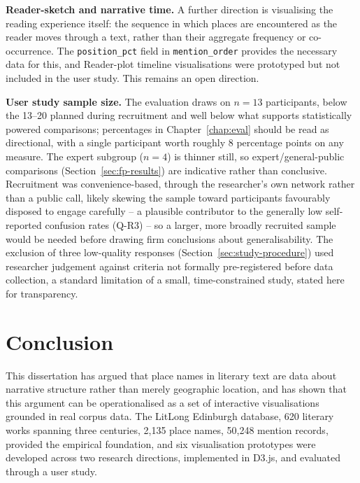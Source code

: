 \documentclass[logo,msc]{infthesis}
\begin{document}
\textbf{Reader-sketch and narrative time.} A further direction is visualising the reading experience itself: the sequence in which places are encountered as the reader moves through a text, rather than their aggregate frequency or co-occurrence. The \texttt{position\_pct} field in \texttt{mention\_order} provides the necessary data for this, and Reader-plot timeline visualisations were prototyped but not included in the user study. This remains an open direction.

\textbf{User study sample size.} The evaluation draws on $n=13$ participants, below the 13--20 planned during recruitment and well below what supports statistically powered comparisons; percentages in Chapter~\ref{chap:eval} should be read as directional, with a single participant worth roughly 8 percentage points on any measure. The expert subgroup ($n=4$) is thinner still, so expert/general-public comparisons (Section~\ref{sec:fp-results}) are indicative rather than conclusive. Recruitment was convenience-based, through the researcher's own network rather than a public call, likely skewing the sample toward participants favourably disposed to engage carefully -- a plausible contributor to the generally low self-reported confusion rates (Q-R3) -- so a larger, more broadly recruited sample would be needed before drawing firm conclusions about generalisability. The exclusion of three low-quality responses (Section~\ref{sec:study-procedure}) used researcher judgement against criteria not formally pre-registered before data collection, a standard limitation of a small, time-constrained study, stated here for transparency.
 
 
\chapter{Conclusion}
\label{chap:conclusion}
 
This dissertation has argued that place names in literary text are data about narrative structure rather than merely geographic location, and has shown that this argument can be operationalised as a set of interactive visualisations grounded in real corpus data. The LitLong Edinburgh database, 620 literary works spanning three centuries, 2,135 place names, 50,248 mention records, provided the empirical foundation, and six visualisation prototypes were developed across two research directions, implemented in D3.js, and evaluated through a user study.
\end{document}
